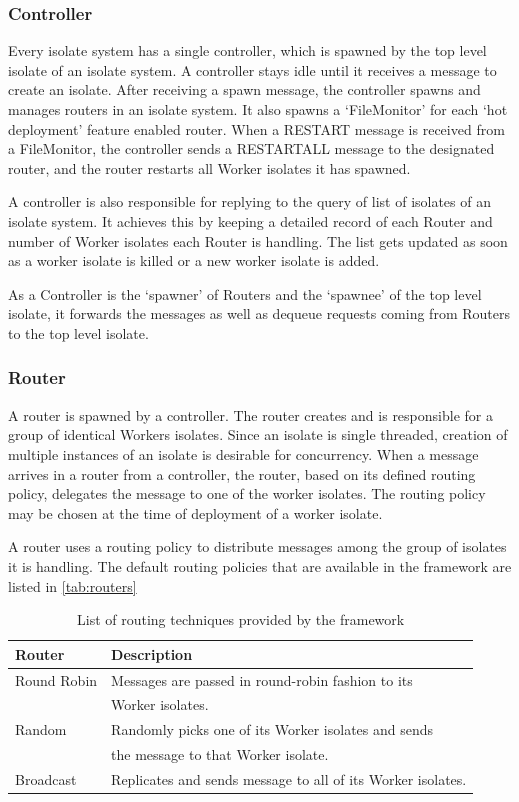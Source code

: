   \subsubsection{Controller}
  Every isolate system has a single controller, which is spawned by the top level isolate of an isolate system. A controller stays idle until it receives a message to create an isolate. After receiving a spawn message, the controller spawns and manages routers in an isolate system. It also spawns a ‘FileMonitor’ for each ‘hot deployment’ feature enabled router. When a RESTART message is received from a FileMonitor, the controller sends a RESTART\textunderscore{}ALL message to the designated router, and the router restarts all Worker isolates it has spawned.

  A controller is also responsible for replying to the query of list of isolates of an isolate system. It achieves this by keeping a detailed record of each Router and number of Worker isolates each Router is handling. The list gets updated as soon as a worker isolate is killed or a new worker isolate is added.

  As a Controller is the ‘spawner’ of Routers and the ‘spawnee’ of the top level isolate, it forwards the messages as well as dequeue requests coming from Routers to the top level isolate.

  \subsubsection{Router}
  \label{subsubsec:router}
  A router is spawned by a controller. The router creates and is responsible for a group of identical Workers isolates. Since an isolate is single threaded, creation of multiple instances of an isolate is desirable for concurrency. When a message arrives in a router from a controller, the router, based on its defined routing policy, delegates the message to one of the worker isolates. The routing policy may be chosen at the time of deployment of a worker isolate.

  A router uses a routing policy to distribute messages among the group of isolates it is handling. The default routing policies that are available in the framework are listed in \autoref{tab:routers}
\begin{table}[htsb]
  \caption[Routing techniques provided by the framework]{List of routing techniques provided by the framework}\label{tab:routers}
  \centering
  \begin{tabular}{l l}
    \toprule
      Router & Description \\
    \midrule
      Round Robin &  Messages are passed in round-robin fashion to its \\ & Worker isolates.\\
      Random &  Randomly picks one of its Worker isolates and sends\\ & the message to that Worker isolate.\\
      Broadcast & Replicates and sends message to all of its Worker isolates.\\
    \bottomrule
  \end{tabular}
\end{table}

